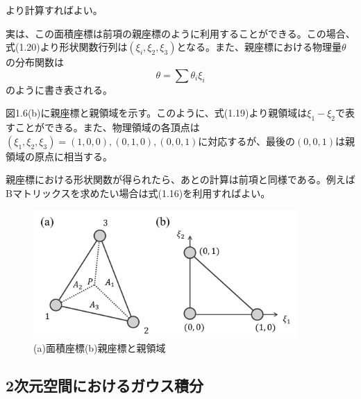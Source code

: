 \documentclass[dvipdfmx, 9pt, a4paper]{jsarticle}
\numberwithin{equation}{section}
\begin{document}
より計算すればよい。\par
実は、この面積座標は前項の親座標のように利用することができる。この場合、式(1.20)より形状関数行列は$(\xi_i, \xi_2, \xi_3)$となる。また、親座標における物理量$\theta$の分布関数は
\begin{equation}
\theta=\sum \theta_i\xi_i
\end{equation}
のように書き表される。\par
図1.6(b)に親座標と親領域を示す。このように、式(1.19)より親領域は$\xi_1-\xi_2$で表すことができる。また、物理領域の各頂点は$(\xi_1, \xi_2, \xi_3)=(1, 0, 0), (0, 1, 0), (0, 0, 1)$に対応するが、最後の$(0, 0, 1)$は親領域の原点に相当する。\par
親座標における形状関数が得られたら、あとの計算は前項と同様である。例えばBマトリックスを求めたい場合は式(1.16)を利用すればよい。

\begin{figure}[t]
\begin{center}
\includegraphics[width = 10cm]{fig1_6.png}
\caption{(a)面積座標(b)親座標と親領域}
\end{center}
\end{figure}

\subsection{2次元空間におけるガウス積分}
\end{document}
